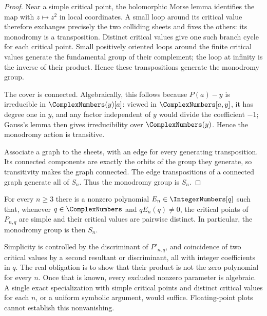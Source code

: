 \begin{proof}
Near a simple critical point, the holomorphic Morse lemma identifies the map
with \(z\mapsto z^2\) in local coordinates.  A small loop around its critical
value therefore exchanges precisely the two colliding sheets and fixes the
others: its monodromy is a transposition.  Distinct critical values give one
such branch cycle for each critical point.  Small positively oriented loops
around the finite critical values generate the fundamental group of their
complement; the loop at infinity is the inverse of their product.  Hence
these transpositions generate the monodromy group.

The cover is connected.  Algebraically, this follows because
\(P(a)-y\) is irreducible in \(\ComplexNumbers(y)[a]\): viewed in \(\ComplexNumbers[a,y]\), it has
degree one in \(y\), and any factor independent of \(y\) would divide the
coefficient \(-1\); Gauss's lemma then gives irreducibility over \(\ComplexNumbers(y)\).
Hence the monodromy action is transitive.

Associate a graph to the sheets, with an edge for every generating
transposition.  Its connected components are exactly the orbits of the group
they generate, so transitivity makes the graph connected.  The edge
transpositions of a connected graph generate all of \(S_n\).  Thus the
monodromy group is \(S_n\).
\end{proof}

\begin{conjecture}
\label{conj:generic-pochhammer-monodromy}
For every \(n\ge3\) there is a nonzero polynomial \(E_n\in\IntegerNumbers[q]\) such that,
whenever \(q\in\ComplexNumbers\) and \(qE_n(q)\ne0\), the critical points of \(P_{n,q}\)
are simple and their critical values are pairwise distinct.  In particular,
the monodromy group is then \(S_n\).
\end{conjecture}

Simplicity is controlled by the discriminant of \(P'_{n,q}\), and coincidence
of two critical values by a second resultant or discriminant, all with integer
coefficients in \(q\).  The real obligation is to show that their product is
not the zero polynomial for every \(n\).  Once that is known, every excluded
nonzero parameter is algebraic.  A single exact specialization with simple
critical points and distinct critical values for each \(n\), or a uniform
symbolic argument, would suffice.  Floating-point plots cannot establish this
nonvanishing.

